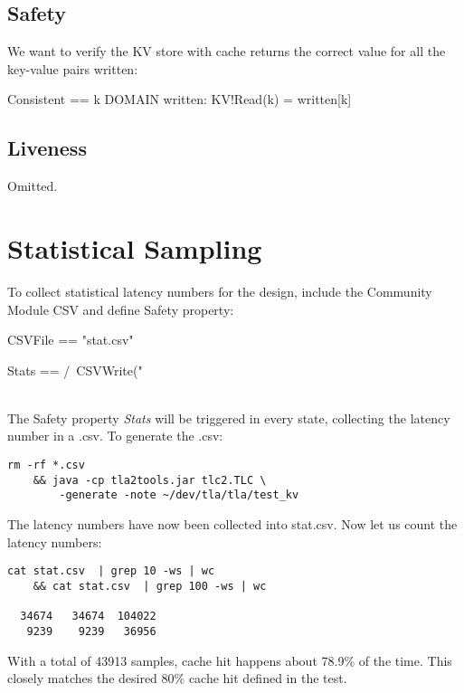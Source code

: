 \subsection{Safety}

We want to verify the KV store with cache returns the correct value for 
all the key-value pairs written:\\

\begin{tla}
Consistent == 
    \A k \in DOMAIN written: 
        KV!Read(k) = written[k]
\end{tla}
\begin{tlatex}
%
%
%
\end{tlatex}

\subsection{Liveness}

Omitted.

\section{Statistical Sampling}

To collect statistical latency numbers for the design, include the Community
Module CSV and define Safety property:\\

\begin{tla}
CSVFile ==
    "stat.csv"

Stats ==
    /\ CSVWrite("%
\end{tla}
\begin{tlatex}
%
%
\@pvspace{8.0pt}%
%
\end{tlatex}
\\

The Safety property \textit{Stats} will be triggered in every state, collecting
the latency number in a .csv. To generate the .csv: 

\begin{verbatim}
rm -rf *.csv 
    && java -cp tla2tools.jar tlc2.TLC \
        -generate -note ~/dev/tla/tla/test_kv
\end{verbatim}

The latency numbers have now been collected into stat.csv. Now let us count the
latency numbers:

\begin{verbatim}
cat stat.csv  | grep 10 -ws | wc 
    && cat stat.csv  | grep 100 -ws | wc

  34674   34674  104022
   9239    9239   36956
\end{verbatim}

With a total of 43913 samples, cache hit happens about 78.9\% of the time. This 
closely matches the desired 80\% cache hit defined in the test.

% 


